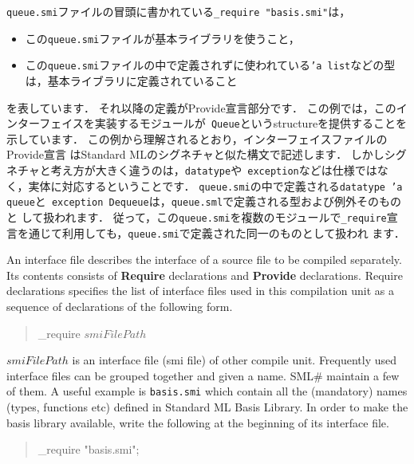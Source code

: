\documentclass{jbook}
\newcommand{\smlsharp}{SML\#}
\newenvironment{program}{\begin{quote}\begin{tt}}%
                        {\end{tt}\end{quote}}
\begin{document}
	{\tt queue.smi}ファイルの冒頭に書かれている{\tt \_require
"basis.smi"}は，
\begin{itemize}
\item この{\tt queue.smi}ファイルが基本ライブラリを使うこと，
\item この{\tt queue.smi}ファイルの中で定義されずに使われている{\tt 'a
list}などの型は，基本ライブラリに定義されていること
\end{itemize}
を表しています．
	それ以降の定義がProvide宣言部分です．
	この例では，このインターフェイスを実装するモジュールが{\tt
Queue}というstructureを提供することを示しています．
	この例から理解されるとおり，インターフェイスファイルのProvide宣言
はStandard MLのシグネチャと似た構文で記述します．
	しかしシグネチャと考え方が大きく違うのは，{\tt datatype}や{\tt
exception}などは仕様ではなく，実体に対応するということです．
	{\tt queue.smi}の中で定義される{\tt datatype 'a queue}と{\tt
exception Dequeue}は，{\tt queue.sml}で定義される型および例外そのものと
して扱われます．
	従って，この{\tt queue.smi}を複数のモジュールで{\tt \_require}宣
言を通じて利用しても，{\tt queue.smi}で定義された同一のものとして扱われ
ます．
\else%

	An interface file describes the interface of a source file to be
compiled separately.
	Its contents consists of 
{\bf Require} declarations and
{\bf Provide} declarations.
	Require declarations specifies the list of interface files
used in this compilation unit as a sequence of declarations of the
following form.
\begin{program}
\_require $smiFilePath$
\end{program}
	$smiFilePath$ is an interface file (smi file) of other compile unit.
	Frequently used interface files can be grouped together and given a
name.
	\smlsharp{} maintain a few of them.
	A useful example is {\tt basis.smi} which contain
all the (mandatory) names (types, functions etc) defined in Standard ML
Basis Library. 
	In order to make the basis library available, write the
following at the beginning of its interface file.
\begin{program}
\_require "basis.smi";
\end{program}
\end{document}

